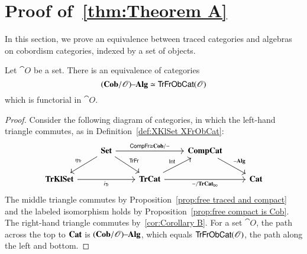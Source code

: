 \documentclass[12pt,oneside,article,draft]{memoir}
\begin{document}
\section{Proof of~\ref{thm:Theorem A}}\label{sec:proof of A}

In this section, we prove an equivalence between traced categories and algebras on cobordism categories, indexed by a set of objects. 

\begin{proposition}\label{prop:natural equivalence cob-O and traced-O}
	Let $\cat{O}$ be a set.
	There is an equivalence of categories 
		$$(\mathbf{Cob}/\mathscr{O}){\text \textendash}\mathbf{Alg}\simeq\mathsf{TrFrObCat}(\mathscr{O})$$
	which is functorial in $\cat{O}$.
\end{proposition}
\begin{proof}
	Consider the following diagram of categories, in which the left-hand triangle commutes, as in Definition~\ref{def:XKlSet XFrObCat}:
	$$
	\begin{tikzcd}
		&\Set\ar[rr,"\Fun{CompFr}\iso\Cat{Cob/-}"]\ar[dl,"\eta_{\Fun{Tr}}"']\ar[dr,"\Fun{TrFr}"]&&\Cat{CompCat}\ar[dr,"\alg"] \\
		\Cat{TrKlSet}\ar[rr,"i_{\Fun{Tr}}"']&&\Cat{TrCat}\ar[ur,"\Fun{Int}"]\ar[rr,"-/\TrCat_{\bo}"']
			&&\Cat{Cat}
	\end{tikzcd}
	$$
	The middle triangle commutes by Proposition~\ref{prop:free traced and compact} and the labeled isomorphism holds by Proposition~\ref{prop:free compact is Cob}.
	The right-hand triangle commutes by~\ref{cor:Corollary B}.
	For a set $\cat{O}$, the path across the top to $\mathbf{Cat}$ is $(\mathbf{Cob}/\mathscr{O}){\text \textendash}\mathbf{Alg}$, which equals $\mathsf{TrFrObCat}(\mathscr{O})$, the path along the left and bottom.
\end{proof}
\end{document}
